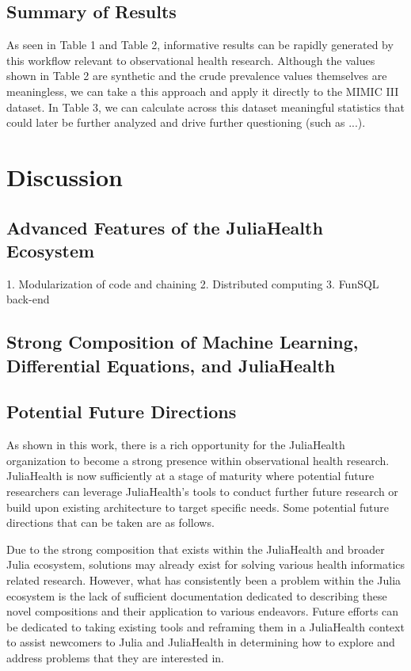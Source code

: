 \documentclass{juliacon}
\begin{document}
\subsection{Summary of Results}

As seen in Table 1 and Table 2, informative results can be rapidly generated by this workflow relevant to observational health research.
Although the values shown in Table 2 are synthetic and the crude prevalence values themselves are meaningless, we can take a this approach and apply it directly to the MIMIC III dataset.
In Table 3, we can calculate across this dataset meaningful statistics that could later be further analyzed and drive further questioning (such as ...).

\section{Discussion}

\subsection{Advanced Features of the JuliaHealth Ecosystem}

    1. Modularization of code and chaining
    2. Distributed computing
    3. FunSQL back-end

\subsection{Strong Composition of Machine Learning, Differential Equations, and JuliaHealth}

\subsection{Potential Future Directions}

As shown in this work, there is a rich opportunity for the JuliaHealth organization to become a strong presence within observational health research. 
JuliaHealth is now sufficiently at a stage of maturity where potential future researchers can leverage JuliaHealth's tools to conduct further future research or build upon existing architecture to target specific needs.
Some potential future directions that can be taken are as follows.

Due to the strong composition that exists within the JuliaHealth and broader Julia ecosystem, solutions may already exist for solving various health informatics related research.
However, what has consistently been a problem within the Julia ecosystem is the lack of sufficient documentation dedicated to describing these novel compositions and their application to various endeavors.
Future efforts can be dedicated to taking existing tools and reframing them in a JuliaHealth context to assist newcomers to Julia and JuliaHealth in determining how to explore and address problems that they are interested in.
\end{document}
